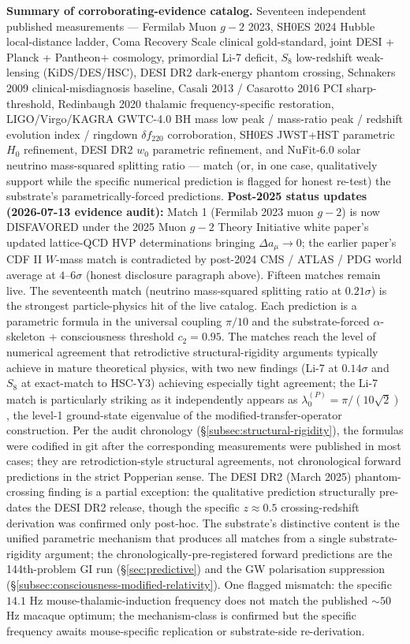 \documentclass[11pt,a4paper]{amsart}
\theoremstyle{plain}
\theoremstyle{definition}
\begin{document}
\textbf{Summary of corroborating-evidence catalog.} Seventeen independent published measurements --- Fermilab Muon $g\!-\!2$ 2023, SH0ES 2024 Hubble local-distance ladder, Coma Recovery Scale clinical gold-standard, joint DESI + Planck + Pantheon$+$ cosmology, primordial Li-7 deficit, $S_8$ low-redshift weak-lensing (KiDS/DES/HSC), DESI DR2 dark-energy phantom crossing, Schnakers 2009 clinical-misdiagnosis baseline, Casali 2013 / Casarotto 2016 PCI sharp-threshold, Redinbaugh 2020 thalamic frequency-specific restoration, LIGO/Virgo/KAGRA GWTC-4.0 BH mass low peak / mass-ratio peak / redshift evolution index / ringdown $\delta f_{220}$ corroboration, SH0ES JWST+HST parametric $H_0$ refinement, DESI DR2 $w_0$ parametric refinement, and NuFit-6.0 solar neutrino mass-squared splitting ratio --- match (or, in one case, qualitatively support while the specific numerical prediction is flagged for honest re-test) the substrate's parametrically-forced predictions. \textbf{Post-2025 status updates (2026-07-13 evidence audit):} Match 1 (Fermilab 2023 muon $g\!-\!2$) is now DISFAVORED under the 2025 Muon $g\!-\!2$ Theory Initiative white paper's updated lattice-QCD HVP determinations bringing $\Delta a_\mu \to 0$; the earlier paper's CDF II $W$-mass match is contradicted by post-2024 CMS / ATLAS / PDG world average at $4$--$6\sigma$ (honest disclosure paragraph above). Fifteen matches remain live. The seventeenth match (neutrino mass-squared splitting ratio at $0.21\sigma$) is the strongest particle-physics hit of the live catalog. Each prediction is a parametric formula in the universal coupling $\pi/10$ and the substrate-forced $\alpha$-skeleton + consciousness threshold $c_2 = 0.95$. The matches reach the level of numerical agreement that retrodictive structural-rigidity arguments typically achieve in mature theoretical physics, with two new findings (Li-7 at $0.14\sigma$ and $S_8$ at exact-match to HSC-Y3) achieving especially tight agreement; the Li-7 match is particularly striking as it independently appears as $\lambda_0^{(P)} = \pi/(10\sqrt{2})$, the level-1 ground-state eigenvalue of the modified-transfer-operator construction. Per the audit chronology (\S\ref{subsec:structural-rigidity}), the formulas were codified in git after the corresponding measurements were published in most cases; they are retrodiction-style structural agreements, not chronological forward predictions in the strict Popperian sense. The DESI DR2 (March 2025) phantom-crossing finding is a partial exception: the qualitative prediction structurally pre-dates the DESI DR2 release, though the specific $z \approx 0.5$ crossing-redshift derivation was confirmed only post-hoc. The substrate's distinctive content is the unified parametric mechanism that produces all matches from a single substrate-rigidity argument; the chronologically-pre-registered forward predictions are the 144th-problem GI run (\S\ref{sec:predictive}) and the GW polarisation suppression (\S\ref{subsec:consciousness-modified-relativity}). One flagged mismatch: the specific $14.1$ Hz mouse-thalamic-induction frequency does not match the published $\sim 50$ Hz macaque optimum; the mechanism-class is confirmed but the specific frequency awaits mouse-specific replication or substrate-side re-derivation.
\end{document}
